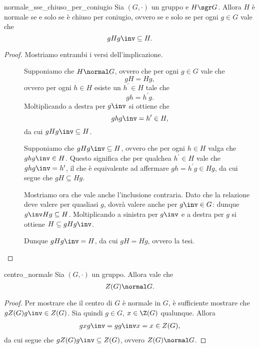 \begin{proposition} {normale_sse_chiuso_per_coniugio}
    Sia $(G, \cdot)$ un gruppo e $H \sgr G$.
    Allora $H$ è normale se e solo se è chiuso per coniugio, ovvero se e solo se per ogni $g \in G$ vale che \[
        gHg\inv \subseteq H.    
    \]
\end{proposition}
\begin{proof}
    Mostriamo entrambi i versi dell'implicazione.
    \begin{description}
        \item[\boximpl ] Supponiamo che $H \normal G$, ovvero che per ogni $g \in G$ vale che \[
            gH = Hg,
        \] ovvero per ogni $h \in H$ esiste un $h^\prime \in H$ tale che \[
            gh = h^\prime g.    
        \] Moltiplicando a destra per $g\inv$ si ottiene che \[
            ghg\inv = h^\prime \in H,   
        \] da cui $gHg\inv \subseteq H$.
        \item[\boximplby] Supponiamo che $gHg\inv \subseteq H$, ovvero che per ogni $h \in H$ valga che $ghg\inv \in H$.
            Questo significa che per qualchea $h^\prime \in H$ vale che $ghg\inv = h^\prime$, 
            il che è equivalente ad affermare $gh = h^\prime g \in Hg$, da cui segue che $gH \subseteq Hg$.

            Mostriamo ora che vale anche l'inclusione contraria.
            Dato che la relazione deve valere per quasliasi $g$, dovrà valere anche per $g\inv \in G$: dunque $g\inv Hg \subseteq H$.
            Moltiplicando a sinistra per $g\inv$ e a destra per $g$ si ottiene $H \subseteq gHg\inv$.

            Dunque $gHg\inv = H$, da cui $gH = Hg$, ovvero la tesi. \qedhere
    \end{description}
\end{proof}

\begin{proposition}
    {centro_normale}
    Sia $(G, \cdot)$ un gruppo. Allora vale che \[
        Z(G) \normal G.    
    \]
\end{proposition}
\begin{proof}
    Per mostrare che il centro di $G$ è normale in $G$, è sufficiente mostrare che $gZ(G)g\inv \in Z(G)$.
    Sia quindi $g \in G$, $x \in \Z(G)$ qualunque. Allora
    \begin{align*}
        gxg\inv = gg\inv x = x \in Z(G),    
    \end{align*} da cui segue che $gZ(G)g\inv \subseteq Z(G)$, ovvero $Z(G) \normal G$.
\end{proof}

